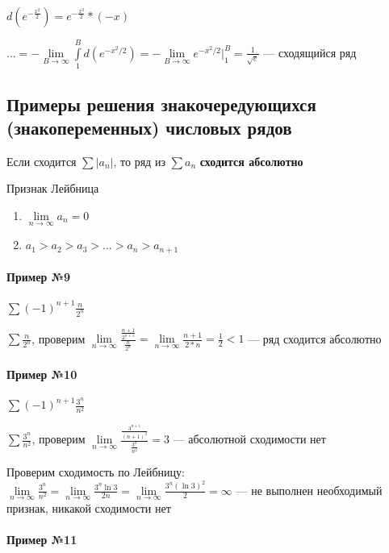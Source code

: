\documentclass{article}
\begin{document}
$d (e^{-\frac{x^2}{2}}) = e^{-\frac{x^2}{2}} * (-x)$

$\dots = - \lim\limits_{B \to \infty} \int\limits_{1}^{B} d(e^{-x^2/2}) = - \lim\limits_{B \to \infty} e^{-x^2/2} \bigg|_{1}^{B} = \frac{1}{\sqrt{e}}$ — сходящийся ряд

\subsection{Примеры решения знакочередующихся (знакопеременных) числовых рядов}

Если сходится $\sum |a_{n}|$, то ряд из $\sum a_{n}$ \textbf{сходится абсолютно}

Признак Лейбница
\begin{enumerate}
    \item $\lim\limits_{n \to \infty} a_{n} = 0$
    \item $a_1 > a_2 > a_3 > \dots > a_{n} > a_{n + 1}$
\end{enumerate}

\paragraph{Пример №9}

$\sum (-1)^{n + 1} \frac{n}{2^{n}}$

$\sum \frac{n}{2^{n}}$, проверим $\lim\limits_{n \to \infty} \frac{\frac{n + 1}{2^{n + 1}}}{\frac{n}{2^{n}}} = \lim\limits_{n \to \infty} \frac{n + 1}{2 * n} = \frac{1}{2} < 1$ — ряд сходится абсолютно

\paragraph{Пример №10}

$\sum (-1)^{n + 1} \frac{3^{n}}{n^2}$

$\sum \frac{3^{n}}{n^2}$, проверим $\lim\limits_{n \to \infty} \frac{\frac{3^{n + 1}}{(n + 1)^2}}{\frac{3^{n}}{n^2}} = 3$ — абсолютной сходимости нет

Проверим сходимость по Лейбницу: $\lim\limits_{n \to \infty} \frac{3^{n}}{n^2} = \lim\limits_{n \to \infty} \frac{3^{n} \ln 3}{2 n} = \lim\limits_{n \to \infty} \frac{3^{n} (\ln 3)^2}{2} = \infty$ — не выполнен необходимый признак, никакой сходимости нет

\paragraph{Пример №11}
\end{document}
